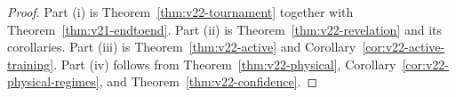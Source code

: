 \begin{proof}
Part (i) is Theorem~\ref{thm:v22-tournament} together with
Theorem~\ref{thm:v21-endtoend}. Part (ii) is
Theorem~\ref{thm:v22-revelation} and its corollaries. Part (iii) is
Theorem~\ref{thm:v22-active} and
Corollary~\ref{cor:v22-active-training}. Part (iv) follows from
Theorem~\ref{thm:v22-physical},
Corollary~\ref{cor:v22-physical-regimes}, and
Theorem~\ref{thm:v22-confidence}.
\end{proof}
